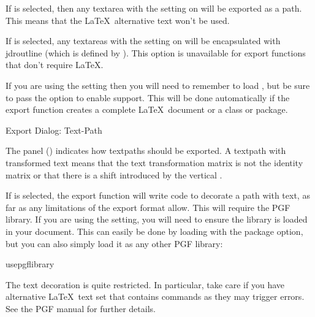 
If  is selected, then any
\gls{textarea} with the  setting on will be
exported as a path. This means that the \LaTeX\ alternative text
won't be used.


If  is selected, any
\glspl{textarea} with the  setting on will be
encapsulated with \gls{jdroutline} (which is defined by
). This option is unavailable for export
functions that don't require \LaTeX.

If you are using the  setting 
then you will need to remember to load ,
but be sure to pass the  option to enable support.
This will be done automatically if the export function creates a
complete \LaTeX\ document or a class or package.


 {}
 {Export Dialog: Text-Path}

The  panel
() indicates how \glspl{textpath}
should be exported. A \gls{textpath} with transformed text means
that the text transformation matrix is not the identity matrix or
that there is a shift introduced by the vertical .


If  is selected, the export function
will write code to decorate a path with text, as far as
any limitations of the export format allow. This will require the
 PGF library. 
If you are using the  setting, you will
need to ensure the library is loaded in your document. This can
easily be done by loading  with the 
package option, but you can also simply load it as any other PGF
library:
\begin{codebox*}
\gls{usepgflibrary}
\end{codebox*}
The text decoration is quite restricted. In particular, take care if
you have alternative \LaTeX\ text set that contains commands as they
may trigger errors. See the PGF manual for further details.

